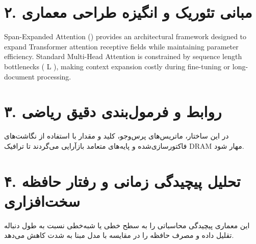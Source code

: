 \documentclass[12pt,a4paper]{article}
\begin{document}
\section*{۲. مبانی تئوریک و انگیزه طراحی معماری}
Span-Expanded Attention () provides an architectural framework designed to expand Transformer attention receptive fields while maintaining parameter efficiency. Standard Multi-Head Attention is constrained by sequence length bottlenecks ( L ), making context expansion costly during fine-tuning or long-document processing.

\section*{۳. روابط و فرمول‌بندی دقیق ریاضی}
در این ساختار، ماتریس‌های پرس‌وجو، کلید و مقدار با استفاده از نگاشت‌های فاکتورسازی‌شده و پایه‌های متعامد بازآرایی می‌گردند تا ترافیک DRAM مهار شود.

\section*{۴. تحلیل پیچیدگی زمانی و رفتار حافظه سخت‌افزاری}
این معماری پیچیدگی محاسباتی را به سطح خطی یا شبه‌خطی نسبت به طول دنباله تقلیل داده و مصرف حافظه را در مقایسه با مدل مبنا به شدت کاهش می‌دهد.
\end{document}
